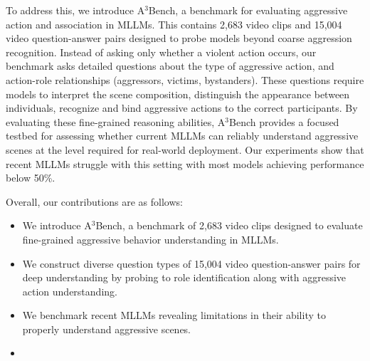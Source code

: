 To address this, we introduce A$^3$Bench, a benchmark for evaluating aggressive action and association in MLLMs. This contains 2,683 video clips and 15,004 video question-answer pairs designed to probe models beyond coarse aggression recognition. Instead of asking only whether a violent action occurs, our benchmark asks detailed questions about the type of aggressive action, and action-role relationships (aggressors, victims, bystanders). These questions require models to interpret the scene composition, distinguish the appearance between individuals, recognize and bind aggressive actions to the correct participants. By evaluating these fine-grained reasoning abilities, A$^3$Bench provides a focused testbed for assessing whether current MLLMs can reliably understand aggressive scenes at the level required for real-world deployment. Our experiments show that recent MLLMs struggle with this setting with most models achieving performance below 50\%. 


Overall, our contributions are as follows:
\begin{itemize}
    
    \item We introduce A$^3$Bench, a benchmark of 2,683 video clips designed to evaluate fine-grained aggressive behavior understanding in MLLMs.
    
    \item We construct diverse question types of 15,004 video question-answer pairs for deep understanding by probing to role identification along with aggressive action understanding.
    
    \item We benchmark recent MLLMs revealing limitations in their ability to properly understand aggressive scenes.

    \item {}
\end{itemize}


